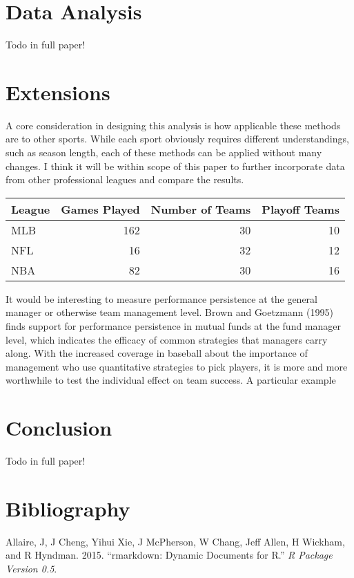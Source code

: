 \documentclass[11pt,]{scrartcl}
\begin{document}
\section{Data Analysis}\label{data-analysis}

Todo in full paper!

\section{Extensions}\label{extensions}

A core consideration in designing this analysis is how applicable these
methods are to other sports. While each sport obviously requires
different understandings, such as season length, each of these methods
can be applied without many changes. I think it will be within scope of
this paper to further incorporate data from other professional leagues
and compare the results.

\begin{longtable}[]{@{}lrrr@{}}
\toprule
League & Games Played & Number of Teams & Playoff Teams\tabularnewline
\midrule
\endhead
MLB & 162 & 30 & 10\tabularnewline
NFL & 16 & 32 & 12\tabularnewline
NBA & 82 & 30 & 16\tabularnewline
\bottomrule
\end{longtable}

It would be interesting to measure performance persistence at the
general manager or otherwise team management level. Brown and Goetzmann
(1995) finds support for performance persistence in mutual funds at the
fund manager level, which indicates the efficacy of common strategies
that managers carry along. With the increased coverage in baseball about
the importance of management who use quantitative strategies to pick
players, it is more and more worthwhile to test the individual effect on
team success. A particular example

\section{Conclusion}\label{conclusion}

Todo in full paper!

\newpage

\section*{Bibliography}\label{bibliography}

\hypertarget{refs}{}
\hypertarget{ref-allaire2015}{}
Allaire, J, J Cheng, Yihui Xie, J McPherson, W Chang, Jeff Allen, H
Wickham, and R Hyndman. 2015. ``rmarkdown: Dynamic Documents for R.''
\emph{R Package Version 0.5}.
\end{document}
